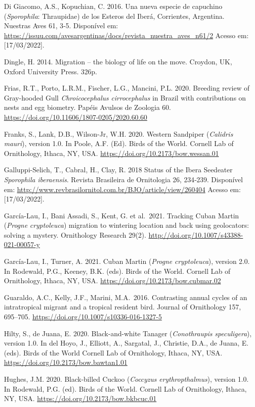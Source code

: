 \documentclass[
  oneside]{scrbook}
\begin{document}
Di Giacomo, A.S., Kopuchian, C. 2016. Una nueva especie de capuchino (\emph{Sporophila}: Thraupidae) de los Esteros del Iberá, Corrientes, Argentina. Nuestras Aves 61, 3‑5. Disponível em: \url{https://issuu.com/avesargentinas/docs/revista_nuestra_aves_n61/2} Acesso em: {[}17/03/2022{]}.

Dingle, H. 2014. Migration -- the biology of life on the move. Croydon, UK, Oxford University Press. 326p.

Frias, R.T., Porto, L.R.M., Fischer, L.G., Mancini, P.L. 2020. Breeding review of Gray-hooded Gull \emph{Chroicocephalus cirrocephalus} in Brazil with contributions on nests and egg biometry. Papéis Avulsos de Zoologia 60. \url{https://doi.org/10.11606/1807-0205/2020.60.60}

Franks, S., Lank, D.B., Wilson-Jr, W.H. 2020. Western Sandpiper (\emph{Calidris mauri}), version 1.0. In Poole, A.F. (Ed). Birds of the World. Cornell Lab of Ornithology, Ithaca, NY, USA. \url{https://doi.org/10.2173/bow.wessan.01}

Galluppi-Selich, T., Cabral, H., Clay, R. 2018 Status of the Ibera Seedeater \emph{Sporophila iberaensis}. Revista Brasileira de Ornitologia 26, 234‑239. Disponível em: \url{http://www.revbrasilornitol.com.br/BJO/article/view/260404} Acesso em: {[}17/03/2022{]}.

García-Lau, I., Bani Assadi, S., Kent, G. et al.~2021. Tracking Cuban Martin (\emph{Progne cryptoleuca}) migration to wintering location and back using geolocators: solving a mystery. Ornithology Research 29(2). \url{http://doi.org/10.1007/s43388-021-00057-y}

García-Lau, I., Turner, A. 2021. Cuban Martin (\emph{Progne cryptoleuca}), version 2.0. In Rodewald, P.G., Keeney, B.K. (eds). Birds of the World. Cornell Lab of Ornithology, Ithaca, NY, USA. \url{https://doi.org/10.2173/bow.cubmar.02}

Guaraldo, A.C., Kelly, J.F., Marini, M.A.~2016. Contrasting annual cycles of an intratropical migrant and a tropical resident bird. Journal of Ornithology 157, 695--705. \url{https://doi.org/10.1007/s10336-016-1327-5}

Hilty, S., de Juana, E. 2020. Black-and-white Tanager (\emph{Conothraupis speculigera}), version 1.0. In del Hoyo, J., Elliott, A., Sargatal, J., Christie, D.A., de Juana, E. (eds). Birds of the World Cornell Lab of Ornithology, Ithaca, NY, USA. \url{https://doi.org/10.2173/bow.bawtan1.01}

Hughes, J.M. 2020. Black-billed Cuckoo (\emph{Coccyzus erythropthalmus}), version 1.0. In Rodewald, P.G. (ed). Birds of the World. Cornell Lab of Ornithology, Ithaca, NY, USA. \url{https://doi.org/10.2173/bow.bkbcuc.01}
\end{document}
